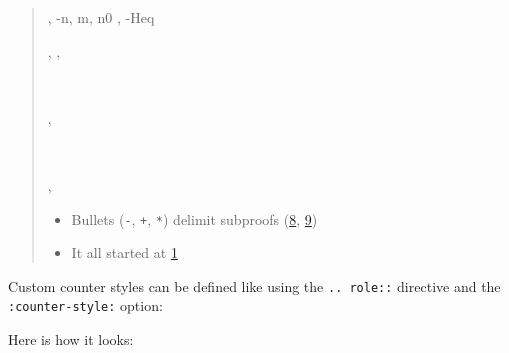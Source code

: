 \documentclass[a4paper]{article}
\begin{document}
\begin{quote}
\begin{alectryon}
\begin{sentence}
\begin{output}
\begin{goals}
\begin{goal}
\begin{hyps}
            \sep
            \hyp{n, m, n0}{}
            \sep
            \hyp{Heq}{~~~}
          \end{hyps}
          \sep
          \infrule{}
          \sep
          \begin{conclusion}
            ~~~~~~~~
          \end{conclusion}
        \end{goal}
      \end{goals}
    \end{output}
  \end{sentence}
  \sep
  \begin{sentence}
    \begin{input}
      ~~~~\nl
    \end{input}
  \end{sentence}
  \sep
  \begin{sentence}
    \begin{input}
    \end{input}
  \end{sentence}
\end{alectryon}

\begin{itemize}
\item Bullets (\texttt{-}, \texttt{+}, \texttt{*}) delimit subproofs (\hyperref[references-rst-setup-s-base-case0]{8}, \hyperref[references-rst-induction0]{9})

\item It all started at \hyperref[references-rst-fixpoint-plus-comm0]{1}
\end{itemize}
\end{quote}

Custom counter styles can be defined like using the \texttt{.. role::} directive and the \texttt{:counter-style:} option:

Here is how it looks:
\end{document}
